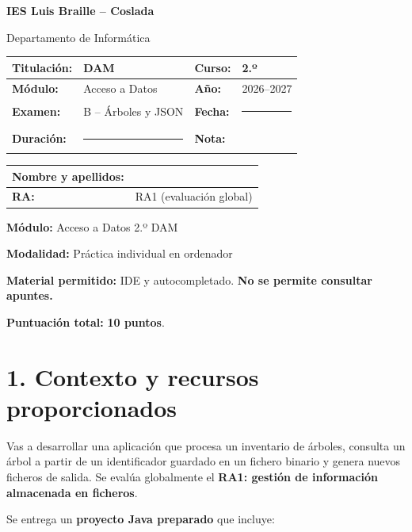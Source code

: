 \documentclass[a4paper,12pt]{article}
\newcommand{\cursoacademico}{2026--2027}
\newcommand{\fechaexamen}{\rule{1.8cm}{0.4pt}}
\newcommand{\tituloexamen}{B -- Árboles y JSON}
\newcommand{\duracionexamen}{\rule{1.8cm}{0.4pt}}
\newcommand{\rasexamen}{RA1 (evaluación global)}
\begin{document}
{\Large\bfseries\color{primary} IES Luis Braille -- Coslada}\par
{\small Departamento de Informática}\par
\vspace{0.2cm}

\begin{tabularx}{\textwidth}{|p{2.2cm}|X|p{2.6cm}|X|}
  \hline
  \textbf{Titulación:} & DAM & \textbf{Curso:} & 2.º \\ \hline
  \textbf{Módulo:} & Acceso a Datos & \textbf{Año:} & \cursoacademico \\ \hline
  \textbf{Examen:} & \tituloexamen & \textbf{Fecha:} & \fechaexamen \\ \hline
  \textbf{Duración:} & \duracionexamen & \cellcolor{grisclaro}\textbf{Nota:} & \cellcolor{grisclaro} \\ \hline
\end{tabularx}
\begin{tabularx}{\textwidth}{|p{4cm}|X|}
  \hline
  \textbf{Nombre y apellidos:} & \\ \hline
  \textbf{RA:} & \rasexamen \\ \hline
\end{tabularx}


\textbf{Módulo:} Acceso a Datos \textperiodcentered{} 2.º DAM\par
\textbf{Modalidad:} Práctica individual en ordenador\par
\textbf{Material permitido:} IDE y autocompletado. \textbf{No se permite consultar apuntes.}\par
\textbf{Puntuación total:} \textbf{10 puntos}.\par

\section*{\color{primary}1. Contexto y recursos proporcionados}

Vas a desarrollar una aplicación que procesa un inventario de árboles, consulta un árbol a partir de un identificador guardado en un fichero binario y genera nuevos ficheros de salida. Se evalúa globalmente el \textbf{RA1: gestión de información almacenada en ficheros}.\par

Se entrega un \textbf{proyecto Java preparado} que incluye:\par
\end{document}
